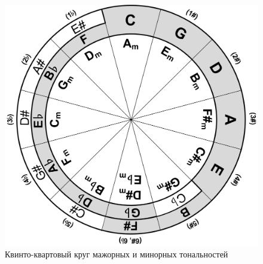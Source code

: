 \begin{figure}[!ht]
    \centering
    \includegraphics[scale=0.8]{fig/kvinto-kvarto/kvinto-kvarto-final} 
    \caption{Квинто-квартовый круг мажорных и минорных тональностей}\label{fig:harmony:kvinto-kvarto:kvinto-kvarto-final}
\end{figure}
